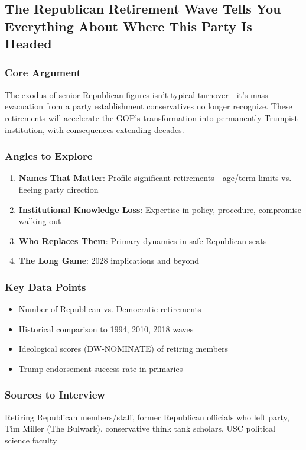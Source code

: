 \documentclass[11pt,letterpaper]{article}
\begin{document}
\newpage
\subsection{The Republican Retirement Wave Tells You Everything About Where This Party Is Headed}

\subsubsection*{Core Argument}
The exodus of senior Republican figures isn't typical turnover---it's mass evacuation from a party establishment conservatives no longer recognize. These retirements will accelerate the GOP's transformation into permanently Trumpist institution, with consequences extending decades.

\subsubsection*{Angles to Explore}
\begin{enumerate}[noitemsep]
    \item \textbf{Names That Matter}: Profile significant retirements---age/term limits vs. fleeing party direction
    \item \textbf{Institutional Knowledge Loss}: Expertise in policy, procedure, compromise walking out
    \item \textbf{Who Replaces Them}: Primary dynamics in safe Republican seats
    \item \textbf{The Long Game}: 2028 implications and beyond
\end{enumerate}

\subsubsection*{Key Data Points}
\begin{itemize}[noitemsep]
    \item Number of Republican vs. Democratic retirements
    \item Historical comparison to 1994, 2010, 2018 waves
    \item Ideological scores (DW-NOMINATE) of retiring members
    \item Trump endorsement success rate in primaries
\end{itemize}

\subsubsection*{Sources to Interview}
Retiring Republican members/staff, former Republican officials who left party, Tim Miller (The Bulwark), conservative think tank scholars, USC political science faculty
\end{document}
